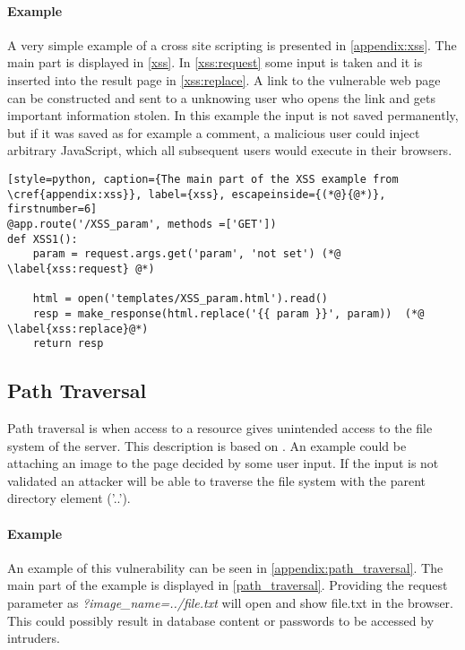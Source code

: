 \paragraph{Example}
A very simple example of a cross site scripting is presented in \cref{appendix:xss}.
The main part is displayed in \cref{xss}.
In \cref{xss:request} some input is taken and it is inserted into the result page in \cref{xss:replace}.
A link to the vulnerable web page can be constructed and sent to a unknowing user who opens the link and gets important information stolen.
In this example the input is not saved permanently, but if it was saved as for example a comment, a malicious user could inject arbitrary JavaScript, which all subsequent users would execute in their browsers.

\begin{lstlisting}[style=python, caption={The main part of the XSS example from \cref{appendix:xss}}, label={xss}, escapeinside={(*@}{@*)}, firstnumber=6]
@app.route('/XSS_param', methods =['GET'])
def XSS1():
    param = request.args.get('param', 'not set') (*@ \label{xss:request} @*)

    html = open('templates/XSS_param.html').read()
    resp = make_response(html.replace('{{ param }}', param))  (*@ \label{xss:replace}@*)
    return resp
\end{lstlisting}

\subsection{Path Traversal}\label{vulnerabilities:traversal}
Path traversal is when access to a resource gives unintended access to the file system of the server.
This description is based on \citet{pathtraversal}.
An example could be attaching an image to the page decided by some user input.
If the input is not validated an attacker will be able to traverse the file system with the parent directory element ('..'). 

\paragraph{Example}
An example of this vulnerability can be seen in \cref{appendix:path_traversal}.
The main part of the example is displayed in \cref{path_traversal}.
Providing the request parameter as \emph{?image\_name=../file.txt} will open and show file.txt in the browser.
This could possibly result in database content or passwords to be accessed by intruders.

